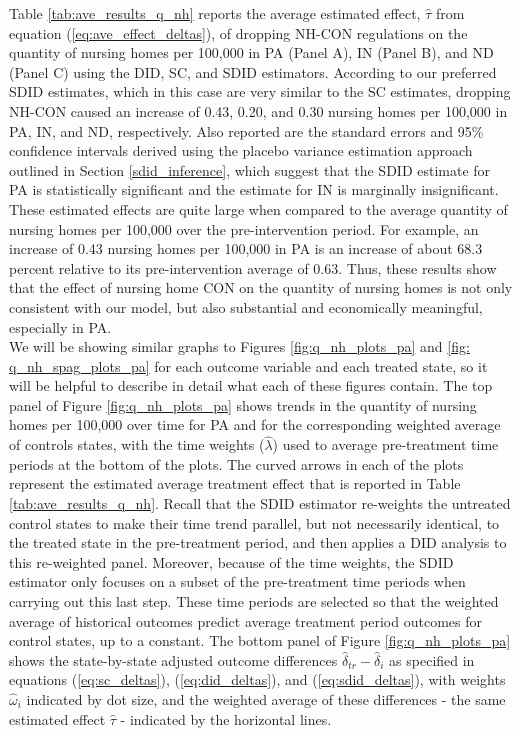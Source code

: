 \documentclass[../Main.tex]{subfiles}
\begin{document}
\indent Table \ref{tab:ave_results_q_nh} reports the average estimated effect, $\hat{\tau}$ from equation (\ref{eq:ave_effect_deltas}), of dropping NH-CON regulations on the quantity of nursing homes per 100,000 in PA (Panel A), IN (Panel B), and ND (Panel C) using the DID, SC, and SDID estimators. According to our preferred SDID estimates, which in this case are very similar to the SC estimates, dropping NH-CON caused an increase of 0.43, 0.20, and 0.30 nursing homes per 100,000 in PA, IN, and ND, respectively. Also reported are the standard errors and 95\% confidence intervals derived using the placebo variance estimation approach outlined in Section \ref{sdid_inference}, which suggest that the SDID estimate for PA is statistically significant and the estimate for IN is marginally insignificant. These estimated effects are quite large when compared to the average quantity of nursing homes per 100,000 over the pre-intervention period. For example, an increase of 0.43 nursing homes per 100,000 in PA is an increase of about 68.3 percent relative to its pre-intervention average of 0.63. Thus, these results show that the effect of nursing home CON on the quantity of nursing homes is not only consistent with our model, but also substantial and economically meaningful, especially in PA.  \\
\indent We will be showing similar graphs to Figures \ref{fig:q_nh_plots_pa} and \ref{fig: q_nh_spag_plots_pa} for each outcome variable and each treated state, so it will be helpful to describe in detail what each of these figures contain. The top panel of Figure \ref{fig:q_nh_plots_pa} shows trends in the quantity of nursing homes per 100,000 over time for PA and for the corresponding weighted average of controls states, with the time weights ($\hat{\lambda}$) used to average pre-treatment time periods at the bottom of the plots. The curved arrows in each of the plots represent the estimated average treatment effect that is reported in Table \ref{tab:ave_results_q_nh}. Recall that the SDID estimator re-weights the untreated control states to make their time trend parallel, but not necessarily identical, to the treated state in the pre-treatment period, and then applies a DID analysis to this re-weighted panel. Moreover, because of the time weights, the SDID estimator only focuses on a subset of the pre-treatment time periods when carrying out this last step. These time periods are selected so that the weighted average of historical outcomes predict average treatment period outcomes for control states, up to a constant. The bottom panel of Figure \ref{fig:q_nh_plots_pa} shows the state-by-state adjusted outcome differences $\hat{\delta}_{tr}-\hat{\delta}_i$ as specified in equations (\ref{eq:sc_deltas}), (\ref{eq:did_deltas}), and (\ref{eq:sdid_deltas}), with weights $\hat{\omega}_i$ indicated by dot size, and the weighted average of these differences - the same estimated effect $\hat{\tau}$ - indicated by the horizontal lines.\\
\end{document}
